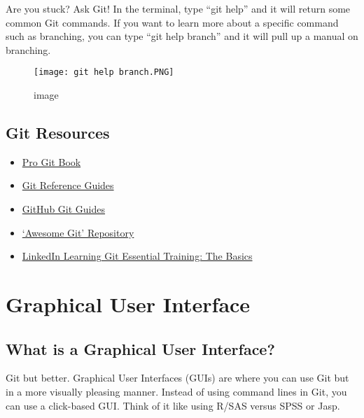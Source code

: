 \documentclass[
]{article}
\providecommand{\tightlist}{%
  \setlength{\itemsep}{0pt}\setlength{\parskip}{0pt}}
\begin{document}
Are you stuck? Ask Git! In the terminal, type ``git help'' and it will
return some common Git commands. If you want to learn more about a
specific command such as branching, you can type ``git help branch'' and
it will pull up a manual on branching.

\begin{figure}
\centering
\texttt{[image: git help branch.PNG]}
\caption{image}
\end{figure}

\hypertarget{git-resources}{%
\subsection{Git Resources}\label{git-resources}}

\begin{itemize}
\tightlist
\item
  \href{https://git-scm.com/book/en/v2}{Pro Git Book}
\item
  \href{https://git-scm.com/docs}{Git Reference Guides}
\item
  \href{https://github.com/git-guides/install-git}{GitHub Git Guides}
\item
  \href{https://github.com/dictcp/awesome-git}{`Awesome Git' Repository}
\item
  \href{https://www.linkedin.com/learning-login/share?account=42166124\&forceAccount=false\&redirect=https\%3A\%2F\%2Fwww.linkedin.com\%2Flearning\%2Fgit-essential-training-the-basics\%3Ftrk\%3Dshare_ent_url\%26shareId\%3DSxKxywffQ8iDu\%252FzDfk84uw\%253D\%253D}{LinkedIn
  Learning Git Essential Training: The Basics}
\end{itemize}

\hypertarget{graphical-user-interface}{%
\section{Graphical User Interface}\label{graphical-user-interface}}

\hypertarget{what-is-a-graphical-user-interface}{%
\subsection{What is a Graphical User
Interface?}\label{what-is-a-graphical-user-interface}}

Git but better. Graphical User Interfaces (GUIs) are where you can use
Git but in a more visually pleasing manner. Instead of using command
lines in Git, you can use a click-based GUI. Think of it like using
R/SAS versus SPSS or Jasp.
\end{document}
